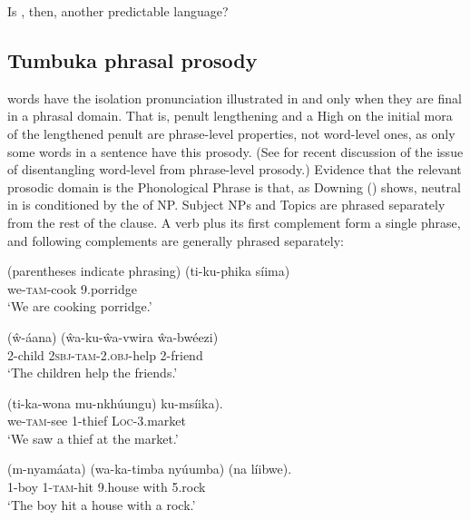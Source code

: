 \documentclass[output=paper
,newtxmath
,modfonts
,nonflat]{langsci/langscibook}
\begin{document}
Is , then, another predictable  language?

\subsection{Tumbuka phrasal prosody}\label{sec:downing:2.2}

 words have the isolation pronunciation illustrated in  and  only when they are final in a phrasal domain. That is, penult lengthening and a High  on the initial mora of the lengthened penult are phrase-level properties, not word-level ones, as only some words in a sentence have this prosody. (See \citealt{Gordon2014} for recent discussion of the issue of disentangling word-level from phrase-level prosody.) Evidence that the relevant prosodic domain is the Phonological Phrase is that, as Downing (\citeyear{Downing2006, Downing2008,Downing2010accent, Downing2012, Downing2017}) shows, neutral  in  is conditioned by the  of NP. Subject NPs and Topics are phrased separately from the rest of the clause.  A verb plus its first complement form a single phrase, and following complements are generally phrased separately:

 

\ea\label{ex:downing:4}   (parentheses indicate phrasing)
\ea\label{ex:downing:4a} \gll (ti-ku-phika síima)\\
we-\textsc{tam}-cook  9.porridge\\
\glt ‘We are cooking porridge.’

\ex\label{ex:downing:4b} \gll (\^w-áana) (\^wa-ku-\^wa-vwira \^wa-bwéezi)\\
2-child 2\textsc{sbj}{}-\textsc{tam}-2.\textsc{obj}{}-help 2-friend\\
\glt ‘The children help the friends.’

\ex\label{ex:downing:4c} \gll (ti-ka-wona mu-nkhúungu) ku-msíika).\\
we-\textsc{tam}-see 1-thief \textsc{Loc}{}-3.market\\
\glt  ‘We saw a thief at the market.’

\ex\label{ex:downing:4d} \gll (m-nyamáata) (wa-ka-timba nyúumba) (na líibwe).\\
1-boy 1-\textsc{tam}-hit 9.house with 5.rock\\
\glt ‘The boy hit a house with a rock.’\\
\end{document}
